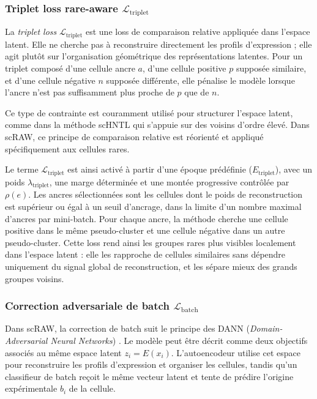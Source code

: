 \subsubsection*{\texorpdfstring{Triplet loss rare-aware \(\mathcal{L}_{\mathrm{triplet}}\)}{Triplet loss rare-aware L triplet}}

La \textit{triplet loss} \(\mathcal{L}_{\mathrm{triplet}}\) \cite{weinberger2005distance} est une loss de comparaison relative appliquée dans l'espace latent. Elle ne cherche pas à reconstruire directement les profils d'expression ; elle agit plutôt sur l'organisation géométrique des représentations latentes. Pour un triplet composé d'une cellule ancre \(a\), d'une cellule positive \(p\) supposée similaire, et d'une cellule négative \(n\) supposée différente, elle pénalise le modèle lorsque l'ancre n'est pas suffisamment plus proche de \(p\) que de \(n\).

Ce type de contrainte est couramment utilisé pour structurer l'espace latent, comme dans la méthode scHNTL \cite{meng_schntl_2025} qui s'appuie sur des voisins d'ordre élevé. Dans scRAW, ce principe de comparaison relative est réorienté et appliqué spécifiquement aux cellules rares.

Le terme \(\mathcal{L}_{\mathrm{triplet}}\) est ainsi activé à partir d'une époque prédéfinie ($E_{\mathrm{triplet}}$), avec un poids \(\lambda_{\mathrm{triplet}}\), une marge déterminée et une montée progressive contrôlée par \(\rho(e)\). Les ancres sélectionnées sont les cellules dont le poids de reconstruction est supérieur ou égal à un seuil d'ancrage, dans la limite d'un nombre maximal d'ancres par mini-batch. Pour chaque ancre, la méthode cherche une cellule positive dans le même pseudo-cluster et une cellule négative dans un autre pseudo-cluster. Cette loss rend ainsi les groupes rares plus visibles localement dans l'espace latent : elle les rapproche de cellules similaires sans dépendre uniquement du signal global de reconstruction, et les sépare mieux des grands groupes voisins.

\subsubsection*{\texorpdfstring{Correction adversariale de batch \(\mathcal{L}_{\mathrm{batch}}\)}{Correction adversariale de batch L batch}}

Dans scRAW, la correction de batch suit le principe des DANN (\textit{Domain-Adversarial Neural Networks}) \cite{ganin2016domain}. Le modèle peut être décrit comme deux objectifs associés au même espace latent \(z_i = E(x_i)\). L'autoencodeur utilise cet espace pour reconstruire les profils d'expression et organiser les cellules, tandis qu'un classifieur de batch reçoit le même vecteur latent et tente de prédire l'origine expérimentale \(b_i\) de la cellule.

